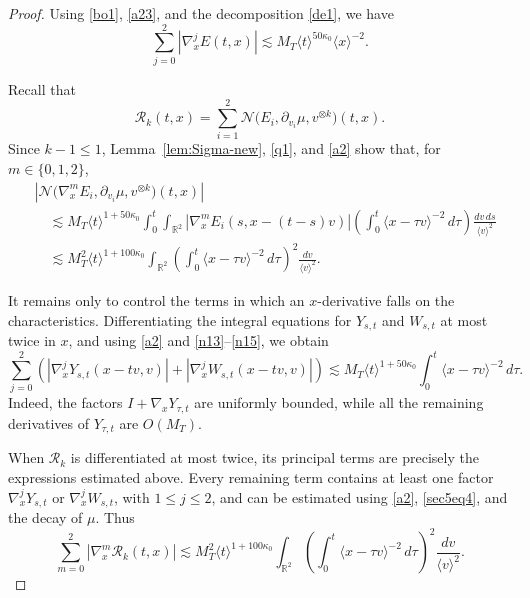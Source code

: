 \documentclass[reqno,11pt]{amsart}
\numberwithin{equation}{section}
\begin{document}
\begin{proof}
	Using \eqref{bo1}, \eqref{a23}, and the decomposition \eqref{de1}, we have
	\begin{equation}\label{a2}
		\sum_{j=0}^2|\nabla_x^jE(t,x)|
		\lesssim
		M_T\langle t\rangle^{50\kappa_0}\langle x\rangle^{-2}.
	\end{equation}

	Recall that
	\[
	\mathcal R_k(t,x)
	=
	\sum_{i=1}^2
	\mathcal N\bigl(E_i,\partial_{v_i}\mu,v^{\otimes k}\bigr)(t,x).
	\]
	Since $k-1\leq1$, Lemma~\ref{lem:Sigma-new}, \eqref{q1}, and
	\eqref{a2} show that, for $m\in\{0,1,2\}$,
	\begin{align*}
	&\left|
	\mathcal N\bigl(\nabla_x^mE_i,\partial_{v_i}\mu,
	v^{\otimes k}\bigr)(t,x)
	\right|\\
	&\quad\lesssim
	M_T\langle t\rangle^{1+50\kappa_0}
	\int_0^t\int_{\mathbb R^2}
	|\nabla_x^mE_i(s,x-(t-s)v)|
	\left(\int_0^t\langle x-\tau v\rangle^{-2}\,d\tau\right)
	\frac{dv\,ds}{\langle v\rangle^2}\\
	&\quad\lesssim
	M_T^2\langle t\rangle^{1+100\kappa_0}
	\int_{\mathbb R^2}
	\left(\int_0^t\langle x-\tau v\rangle^{-2}\,d\tau\right)^2
	\frac{dv}{\langle v\rangle^2}.
	\end{align*}

	It remains only to control the terms in which an $x$-derivative falls
	on the characteristics. Differentiating the integral equations for
	$Y_{s,t}$ and $W_{s,t}$ at most twice in $x$, and using
	\eqref{a2} and \eqref{n13}--\eqref{n15}, we obtain
	\begin{equation}\label{sec5eq4}
	\sum_{j=0}^2
	\left(
	|\nabla_x^jY_{s,t}(x-tv,v)|
	+
	|\nabla_x^jW_{s,t}(x-tv,v)|
	\right)
	\lesssim
	M_T\langle t\rangle^{1+50\kappa_0}
	\int_0^t\langle x-\tau v\rangle^{-2}\,d\tau.
	\end{equation}
	Indeed, the factors $I+\nabla_xY_{\tau,t}$ are uniformly bounded,
	while all the remaining derivatives of $Y_{\tau,t}$ are
	$O(M_T)$.

	When $\mathcal R_k$ is differentiated at most twice, its principal
	terms are precisely the expressions estimated above. Every remaining
	term contains at least one factor
	$\nabla_x^jY_{s,t}$ or $\nabla_x^jW_{s,t}$, with $1\leq j\leq2$, and can be estimated using \eqref{a2}, \eqref{sec5eq4}, and the decay of $\mu$. Thus
	\begin{equation}\label{Rk-crude-master}
	\sum_{m=0}^2|\nabla_x^m\mathcal R_k(t,x)|
	\lesssim
	M_T^2\langle t\rangle^{1+100\kappa_0}
	\int_{\mathbb R^2}
	\left(
	\int_0^t\langle x-\tau v\rangle^{-2}\,d\tau
	\right)^2
	\frac{dv}{\langle v\rangle^2}.
	\end{equation}


\end{proof}
\end{document}
